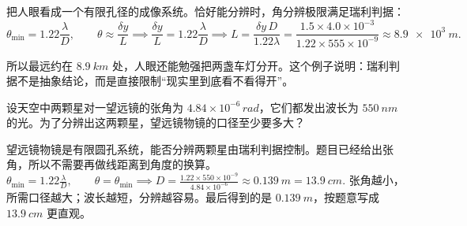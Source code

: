 \begin{solution}
把人眼看成一个有限孔径的成像系统。恰好能分辨时，角分辨极限满足瑞利判据：
\[
\theta_{\min}=1.22\frac{\lambda}{D},\qquad
\theta\approx \frac{\delta y}{L}
\implies
\frac{\delta y}{L}=1.22\frac{\lambda}{D}
\implies
L=\frac{\delta y\,D}{1.22\lambda}
=\frac{1.5\times 4.0\times 10^{-3}}{1.22\times 555\times 10^{-9}}
\approx \SI{8.9e3}{m}.
\]

所以最远约在 \(\SI{8.9}{km}\) 处，人眼还能勉强把两盏车灯分开。这个例子说明：瑞利判据不是抽象结论，而是直接限制“现实里到底看不看得开”。
\end{solution}

\begin{exercise}
设天空中两颗星对一望远镜的张角为 \(4.84\times10^{-6}\,\si{rad}\)，它们都发出波长为 \(\SI{550}{nm}\) 的光。为了分辨出这两颗星，望远镜物镜的口径至少要多大？
\end{exercise}

\begin{solution}
望远镜物镜是有限圆孔系统，能否分辨两颗星由瑞利判据控制。题目已经给出张角，所以不需要再做线距离到角度的换算。
 \(\theta_{\min}=1.22\frac{\lambda}{D},\qquad \theta=\theta_{\min} \implies D=\frac{1.22\times 550\times10^{-9}}{4.84\times10^{-6}} \approx \SI{0.139}{m} =\SI{13.9}{cm}.\) 
张角越小，所需口径越大；波长越短，分辨越容易。最后得到的是 \(\SI{0.139}{m}\)，按题意写成 \(\SI{13.9}{cm}\) 更直观。
\end{solution}
